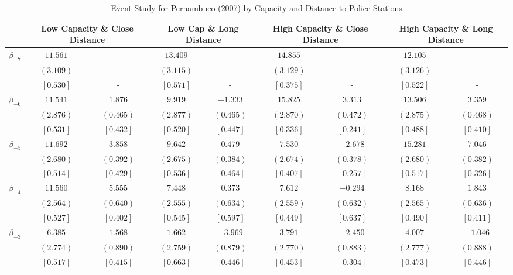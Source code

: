 \documentclass[12pt]{article}
\begin{document}
\begin{table}[h!]
\centering
\caption{Event Study for Pernambuco (2007) by Capacity and Distance to Police Stations}
\label{tab:event_study_PE_het}
\begin{adjustbox}{width=\textwidth}
\begin{tabular}{lcccccccc}
\toprule
& \multicolumn{2}{c}{Low Capacity \& Close Distance} & \multicolumn{2}{c}{Low Cap \& Long Distance} & \multicolumn{2}{c}{High Capacity \& Close Distance} & \multicolumn{2}{c}{High Capacity \& Long Distance} \\
\cmidrule(lr){2-3} \cmidrule(lr){4-5} \cmidrule(lr){6-7} \cmidrule(lr){8-9}
\midrule
$\beta_{-7}$ & $ 11.561$ & - & $ 13.409$ & - & $ 14.855$ & - & $ 12.105$ & - \\
& $(  3.109)$ & - & $(  3.115)$ & - & $(  3.129)$ & - & $(  3.126)$ & - \\
& $[  0.530]$ & - & $[  0.571]$ & - & $[  0.375]$ & - & $[  0.522]$ & - \\

$\beta_{-6}$ & $ 11.541$ & $  1.876$ & $  9.919$ & $ -1.333$ & $ 15.825$ & $  3.313$ & $ 13.506$ & $  3.359$ \\
& $(  2.876)$ & $(  0.465)$ & $(  2.877)$ & $(  0.465)$ & $(  2.870)$ & $(  0.472)$ & $(  2.875)$ & $(  0.468)$ \\
& $[  0.531]$ & $[  0.432]$ & $[  0.520]$ & $[  0.447]$ & $[  0.336]$ & $[  0.241]$ & $[  0.488]$ & $[  0.410]$ \\

$\beta_{-5}$ & $ 11.692$ & $  3.858$ & $  9.642$ & $  0.479$ & $  7.530$ & $ -2.678$ & $ 15.281$ & $  7.046$ \\
& $(  2.680)$ & $(  0.392)$ & $(  2.675)$ & $(  0.384)$ & $(  2.674)$ & $(  0.378)$ & $(  2.680)$ & $(  0.382)$ \\
& $[  0.514]$ & $[  0.429]$ & $[  0.536]$ & $[  0.464]$ & $[  0.407]$ & $[  0.257]$ & $[  0.517]$ & $[  0.326]$ \\

$\beta_{-4}$ & $ 11.560$ & $  5.555$ & $  7.448$ & $  0.373$ & $  7.612$ & $ -0.294$ & $  8.168$ & $  1.843$ \\
& $(  2.564)$ & $(  0.640)$ & $(  2.555)$ & $(  0.634)$ & $(  2.559)$ & $(  0.632)$ & $(  2.565)$ & $(  0.636)$ \\
& $[  0.527]$ & $[  0.402]$ & $[  0.545]$ & $[  0.597]$ & $[  0.449]$ & $[  0.637]$ & $[  0.490]$ & $[  0.411]$ \\

$\beta_{-3}$ & $  6.385$ & $  1.568$ & $  1.662$ & $ -3.969$ & $  3.791$ & $ -2.450$ & $  4.007$ & $ -1.046$ \\
& $(  2.774)$ & $(  0.890)$ & $(  2.759)$ & $(  0.879)$ & $(  2.770)$ & $(  0.883)$ & $(  2.777)$ & $(  0.888)$ \\
& $[  0.517]$ & $[  0.415]$ & $[  0.663]$ & $[  0.446]$ & $[  0.453]$ & $[  0.304]$ & $[  0.473]$ & $[  0.446]$ \\


\end{tabular}
\end{adjustbox}
\end{table}
\end{document}
